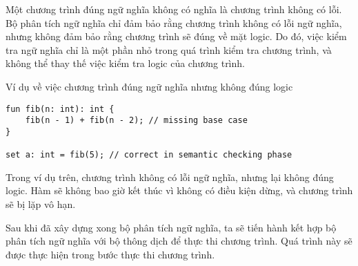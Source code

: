     Một chương trình đúng ngữ nghĩa không có nghĩa là chương trình không có lỗi. Bộ phân tích ngữ nghĩa chỉ đảm bảo rằng chương trình không có lỗi ngữ nghĩa, nhưng không đảm bảo rằng chương trình sẽ đúng về mặt logic. Do đó, việc kiểm tra ngữ nghĩa chỉ là một phần nhỏ trong quá trình kiểm tra chương trình, và không thể thay thế việc kiểm tra logic của chương trình.

\noindent Ví dụ về việc chương trình đúng ngữ nghĩa nhưng không đúng logic
\begin{lstlisting}[]
fun fib(n: int): int {
    fib(n - 1) + fib(n - 2); // missing base case
}

set a: int = fib(5); // correct in semantic checking phase
\end{lstlisting}

    Trong ví dụ trên, chương trình không có lỗi ngữ nghĩa, nhưng lại không đúng logic. Hàm  sẽ không bao giờ kết thúc vì không có điều kiện dừng, và chương trình sẽ bị lặp vô hạn.

    Sau khi đã xây dựng xong bộ phân tích ngữ nghĩa, ta sẽ tiến hành kết hợp bộ phân tích ngữ nghĩa với bộ thông dịch để thực thi chương trình. Quá trình này sẽ được thực hiện trong bước thực thi chương trình.
